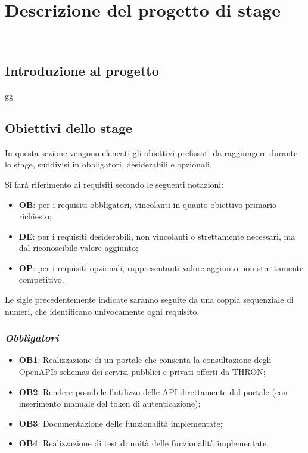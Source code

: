 \chapter{Descrizione del progetto di stage}
\label{cap:descrizione-stage}

\\

\section{Introduzione al progetto}
gg

\section{Obiettivi dello stage}
In questa sezione vengono elencati gli obiettivi prefissati da raggiungere durante lo stage, suddivisi in obbligatori, desiderabili e opzionali.

Si farà riferimento ai requisiti secondo le seguenti notazioni:
\begin{itemize}
    \item \textbf{OB}: per i requisiti obbligatori, vincolanti in quanto obiettivo primario richiesto;
    \item \textbf{DE}: per i requisiti desiderabili, non vincolanti o strettamente necessari, ma dal riconoscibile valore aggiunto;
    \item \textbf{OP}: per i requisiti opzionali, rappresentanti valore aggiunto non strettamente competitivo.
\end{itemize}
Le sigle precedentemente indicate saranno seguite da una coppia sequenziale di numeri, che identificano univocamente ogni requisito.

\subsection*{\emph{Obbligatori}}
\begin{itemize}
    \item \textbf{OB1}: Realizzazione di un portale che consenta la consultazione degli OpenAPIs schemas dei servizi pubblici e privati offerti da THRON;
    \item \textbf{OB2}: Rendere possibile l'utilizzo delle API direttamente dal portale (con inserimento manuale del token di autenticazione);
    \item \textbf{OB3}: Documentazione delle funzionalità implementate;
    \item \textbf{OB4}: Realizzazione di test di unità delle funzionalità implementate.
\end{itemize}

